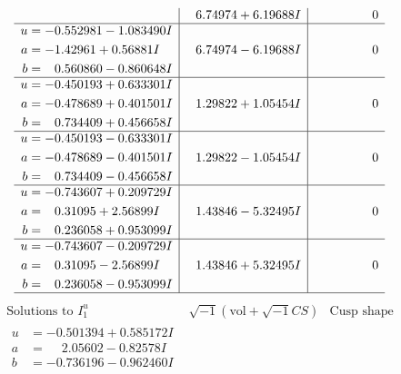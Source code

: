 \documentclass[1p]{elsarticle_modified}
\theoremstyle{definition}
\newcommand{\I}{\sqrt{-1}}
\begin{document}
$$\begin{array}{c|c|c}
 & \phantom{-}6.74974 + 6.19688 I & \phantom{-0.000000 } 0 \\ \hline\begin{aligned}
u &= -0.552981 - 1.083490 I \\
a &= -1.42961 + 0.56881 I \\
b &= \phantom{-}0.560860 - 0.860648 I\end{aligned}
 & \phantom{-}6.74974 - 6.19688 I & \phantom{-0.000000 } 0 \\ \hline\begin{aligned}
u &= -0.450193 + 0.633301 I \\
a &= -0.478689 + 0.401501 I \\
b &= \phantom{-}0.734409 + 0.456658 I\end{aligned}
 & \phantom{-}1.29822 + 1.05454 I & \phantom{-0.000000 } 0 \\ \hline\begin{aligned}
u &= -0.450193 - 0.633301 I \\
a &= -0.478689 - 0.401501 I \\
b &= \phantom{-}0.734409 - 0.456658 I\end{aligned}
 & \phantom{-}1.29822 - 1.05454 I & \phantom{-0.000000 } 0 \\ \hline\begin{aligned}
u &= -0.743607 + 0.209729 I \\
a &= \phantom{-}0.31095 + 2.56899 I \\
b &= \phantom{-}0.236058 + 0.953099 I\end{aligned}
 & \phantom{-}1.43846 - 5.32495 I & \phantom{-0.000000 } 0 \\ \hline\begin{aligned}
u &= -0.743607 - 0.209729 I \\
a &= \phantom{-}0.31095 - 2.56899 I \\
b &= \phantom{-}0.236058 - 0.953099 I\end{aligned}
 & \phantom{-}1.43846 + 5.32495 I & \phantom{-0.000000 } 0\\
 \hline 
 \end{array}$$\newpage$$\begin{array}{c|c|c}  
\text{Solutions to }I^u_{1}& \I (\text{vol} + \sqrt{-1}CS) & \text{Cusp shape}\\
 \hline 
\begin{aligned}
u &= -0.501394 + 0.585172 I \\
a &= \phantom{-}2.05602 - 0.82578 I \\
b &= -0.736196 - 0.962460 I\end{aligned}

\end{array}$$
\end{document}
